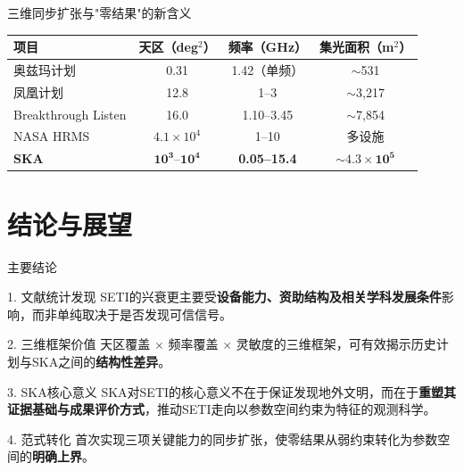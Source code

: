 \documentclass{sysupptthesis}
\begin{document}
\begin{frame}{三维同步扩张与"零结果"的新含义}

    \begin{table}
        \centering\small
        \begin{tabular}{lccc}
            \hline
            \textbf{项目} & \textbf{天区（deg$^2$）} & \textbf{频率（GHz）} & \textbf{集光面积（m$^2$）} \\
            \hline
            奥兹玛计划 & 0.31 & 1.42（单频） & $\sim$531 \\
            凤凰计划 & 12.8 & 1--3 & $\sim$3,217 \\
            Breakthrough Listen & 16.0 & 1.10--3.45 & $\sim$7,854 \\
            NASA HRMS & $4.1 \times 10^4$ & 1--10 & 多设施 \\
            \textbf{SKA} & $\mathbf{10^3}$--$\mathbf{10^4}$ & \textbf{0.05--15.4} & $\mathbf{\sim 4.3 \times 10^5}$ \\
            \hline
        \end{tabular}
    \end{table}
\end{frame}

\section{结论与展望}

\begin{frame}{主要结论}
    \begin{block}{1. 文献统计发现}
        SETI的兴衰更主要受\textbf{设备能力、资助结构及相关学科发展条件}影响，而非单纯取决于是否发现可信信号。
    \end{block}

    \begin{block}{2. 三维框架价值}
        天区覆盖 $\times$ 频率覆盖 $\times$ 灵敏度的三维框架，可有效揭示历史计划与SKA之间的\textbf{结构性差异}。
    \end{block}

    \begin{block}{3. SKA核心意义}
        SKA对SETI的核心意义不在于保证发现地外文明，而在于\textbf{重塑其证据基础与成果评价方式}，推动SETI走向以参数空间约束为特征的观测科学。
    \end{block}

    \begin{block}{4. 范式转化}
        首次实现三项关键能力的同步扩张，使零结果从弱约束转化为参数空间的\textbf{明确上界}。
    \end{block}
\end{frame}
\end{document}
